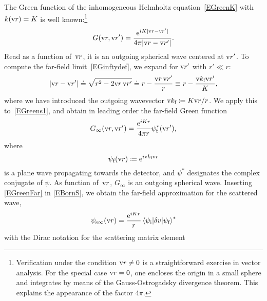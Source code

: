 The Green function of the inhomogeneous Helmholtz equation~\cref{EGreenK}
with $k(\text{v}{r})=K$ is well known:\footnote
{Verification under the condition $\text{v}{r}\ne0$
is a straightforward exercise in vector analysis.
For the special case $\text{v}{r}=0$,
one encloses the origin in a small sphere
and integrates by means of the Gauss-Ostrogadsky divergence theorem.
This explains the appearance of the factor $4\pi$.}
%
\begin{equation}\label{EGreens1}
  G(\text{v}{r},\text{v}{r}') = \frac{\mathrm e^{iK|\text{v}{r}-\text{v}{r}'|}}{4\pi |\text{v}{r}-\text{v}{r}'|}.
\end{equation}
Read as a function of~$\text{v}{r}$, it is an outgoing spherical wave centered at $\text{v}{r}'$.
To compute the far-field limit~\cref{EGinftydef},
we expand for $\text{v}{r}'$ with $r'\ll r$:
\begin{equation}
  \left|\text{v}{r}-\text{v}{r}'\right|
  \doteq \sqrt{r^2-2\text{v}{r}\,\text{v}{r}'}
  \doteq r - \frac{\text{v}{r}\,\text{v}{r}'}{r}
  \equiv r - \frac{\text{v}{k}_{\text{f}} \text{v}{r}'}{K},
\end{equation}
%
where we have introduced the outgoing wavevector
$  \text{v}{k}_{\text{f}}\coloneqq K \text{v}{r} / r$.
We apply this to~\cref{EGreens1},
%
and obtain in leading order the far-field Green function
\begin{equation}\label{EGreenFar}
  G_\infty(\text{v}{r},\text{v}{r}')
  = \frac{\mathrm e^{iKr}}{4\pi r}\psi^*_{\text{f}}(\text{v}{r}'),
\end{equation}
%
where
\begin{equation}\label{EPsisfar}
  \psi_{\text{f}}(\text{v}{r}) \coloneqq  \mathrm e^{i\text{v}{k}_{\text{f}} \text{v}{r}}
\end{equation}
%
is a plane wave propagating towards the detector,
and $\psi^*$ designates the complex conjugate of $\psi$.
As function of~$\text{v}{r}$, $G_\infty$ is an outgoing spherical wave.
Inserting \cref{EGreenFar} in \cref{EBornS},
we obtain the far-field approximation for the scattered wave,
%
\begin{equation}\label{EsandwichC}
  \psi_{\text{s}\infty}(\text{v}{r})
  = \frac{\mathrm e^{iKr}}{r}
    \left\langle \psi_{\text{i}}|\delta v|\psi_{\text{f}}\right\rangle^*
\end{equation}
%
with the Dirac notation for the scattering matrix element
